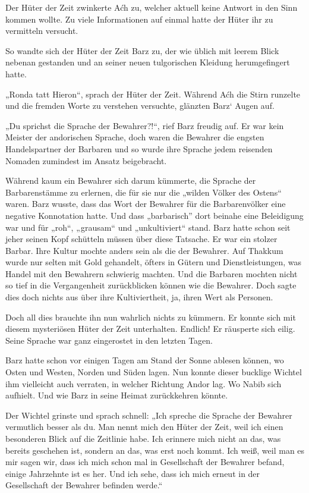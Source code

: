 Der Hüter der Zeit zwinkerte Aćh zu, welcher aktuell keine Antwort in den Sinn kommen wollte. Zu viele Informationen auf einmal hatte der Hüter ihr zu vermitteln versucht.

So wandte sich der Hüter der Zeit Barz zu, der wie üblich mit leerem Blick nebenan gestanden und an seiner neuen tulgorischen Kleidung herumgefingert hatte.

„Ronda tatt Hieron“, sprach der Hüter der Zeit. Während Aćh die Stirn runzelte und die fremden Worte zu verstehen versuchte, glänzten Barz‘ Augen auf.\bigskip







„Du sprichst die Sprache der Bewahrer?!“, rief Barz freudig auf. Er war kein Meister der andorischen Sprache, doch waren die Bewahrer die engsten Handelspartner der Barbaren und so wurde ihre Sprache jedem reisenden Nomaden zumindest im Ansatz beigebracht.

Während kaum ein Bewahrer sich darum kümmerte, die Sprache der Barbarenstämme zu erlernen, die für sie nur die „wilden Völker des Ostens“ waren. Barz wusste, dass das Wort der Bewahrer für die Barbarenvölker eine negative Konnotation hatte. Und dass „barbarisch” dort beinahe eine Beleidigung war und für „roh“, „grausam“ und „unkultiviert“ stand. Barz hatte schon seit jeher seinen Kopf schütteln müssen über diese Tatsache. Er war ein stolzer Barbar. Ihre Kultur mochte anders sein als die der Bewahrer. Auf Thakkum wurde nur selten mit Gold gehandelt, öfters in Gütern und Dienstleistungen, was Handel mit den Bewahrern schwierig machten. Und die Barbaren mochten nicht so tief in die Vergangenheit zurückblicken können wie die Bewahrer. Doch sagte dies doch nichts aus über ihre Kultiviertheit, ja, ihren Wert als Personen.

Doch all dies brauchte ihn nun wahrlich nichts zu kümmern. Er konnte sich mit diesem mysteriösen Hüter der Zeit unterhalten. Endlich! Er räusperte sich eilig. Seine Sprache war ganz eingerostet in den letzten Tagen.

Barz hatte schon vor einigen Tagen am Stand der Sonne ablesen können, wo Osten und Westen, Norden und Süden lagen. Nun konnte dieser bucklige Wichtel ihm vielleicht auch verraten, in welcher Richtung Andor lag. Wo Nabib sich aufhielt. Und wie Barz in seine Heimat zurückkehren könnte.

Der Wichtel grinste und sprach schnell: „Ich spreche die Sprache der Bewahrer vermutlich besser als du. Man nennt mich den Hüter der Zeit, weil ich einen besonderen Blick auf die Zeitlinie habe. Ich erinnere mich nicht an das, was bereits geschehen ist, sondern an das, was erst noch kommt. Ich weiß, weil man es mir sagen wir, dass ich mich schon mal in Gesellschaft der Bewahrer befand, einige Jahrzehnte ist es her. Und ich sehe, dass ich mich erneut in der Gesellschaft der Bewahrer befinden werde.“

